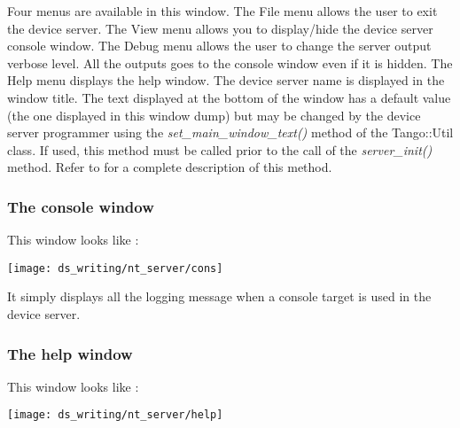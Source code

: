 \vspace{0.3cm}


Four menus are available in this window. The File menu allows the
user to exit the device server. The View menu allows you to display/hide
the device server console window. The Debug menu allows the user to
change the server output verbose level. All the outputs
goes to the console window even if it is hidden. The Help menu displays
the help window. The device server name is displayed in the window
title. The text displayed at the bottom of the window has a default
value (the one displayed in this window dump) but may be changed by
the device server programmer using the \emph{set\_main\_window\_text()}
method of the Tango::Util class. If used, this method must be called
prior to the call of the \emph{server\_init()}
method. Refer to \cite{TANGO_ref_man} for a complete description
of this method.


\subsubsection{The console window}

This window looks like :

\vspace{0.3cm}


\begin{center}
\texttt{[image: ds\_writing/nt\_server/cons]}
\par\end{center}

\vspace{0.3cm}


It simply displays all the logging\emph{} message
when a console target is used in the device server. 


\subsubsection{The help window}

This window looks like :

\vspace{0.3cm}


\begin{center}
\texttt{[image: ds\_writing/nt\_server/help]}
\par\end{center}



\vspace{0.3cm}


